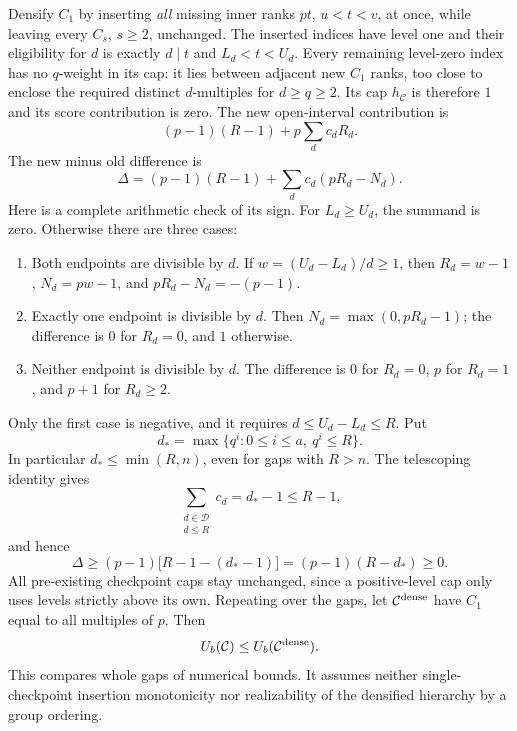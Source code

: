 \documentclass[11pt,letterpaper]{article}
\theoremstyle{definition}\newtheorem{definition}{Definition}
\newcommand{\D}{\mathcal D}
\newcommand{\C}{\mathcal C}
\begin{document}
Densify $C_1$ by inserting \emph{all} missing inner ranks $pt$, $u<t<v$, at once, while leaving every $C_s$, $s\ge2$, unchanged. The inserted indices have level one and their eligibility for $d$ is exactly $d\mid t$ and $L_d<t<U_d$. Every remaining level-zero index has no $q$-weight in its cap: it lies between adjacent new $C_1$ ranks, too close to enclose the required distinct $d$-multiples for $d\ge q\ge2$. Its cap $h_{\C}$ is therefore $1$ and its score contribution is zero. The new open-interval contribution is
\[
(p-1)(R-1)+p\sum_d c_dR_d.
\]
The new minus old difference is
\begin{equation}
\Delta=(p-1)(R-1)+\sum_d c_d(pR_d-N_d).\label{eq:delta}
\end{equation}
Here is a complete arithmetic check of its sign. For $L_d\ge U_d$, the summand is zero. Otherwise there are three cases:
\begin{enumerate}
\item Both endpoints are divisible by $d$. If $w=(U_d-L_d)/d\ge1$, then $R_d=w-1$, $N_d=pw-1$, and $pR_d-N_d=-(p-1)$.
\item Exactly one endpoint is divisible by $d$. Then $N_d=\max(0,pR_d-1)$; the difference is $0$ for $R_d=0$, and $1$ otherwise.
\item Neither endpoint is divisible by $d$. The difference is $0$ for $R_d=0$, $p$ for $R_d=1$, and $p+1$ for $R_d\ge2$.
\end{enumerate}
Only the first case is negative, and it requires $d\le U_d-L_d\le R$. Put
\[
d_* = \max\{q^i:0\le i\le a,\ q^i\le R\}.
\]
In particular $d_*\le\min(R,n)$, even for gaps with $R>n$. The telescoping identity gives
\[
\sum_{\substack{d\in\D\\d\le R}}c_d=d_*-1\le R-1,
\]
and hence
\begin{equation}
\Delta\ge(p-1)\bigl[R-1-(d_*-1)\bigr]=(p-1)(R-d_*)\ge0.\label{eq:deltasign}
\end{equation}
All pre-existing checkpoint caps stay unchanged, since a positive-level cap only uses levels strictly above its own. Repeating over the gaps, let $\C^{\rm dense}$ have $C_1$ equal to all multiples of $p$. Then
\begin{equation}
U_b(\C)\le U_b(\C^{\rm dense}).\label{eq:densification}
\end{equation}
This compares whole gaps of numerical bounds. It assumes neither single-checkpoint insertion monotonicity nor realizability of the densified hierarchy by a group ordering.
\end{document}
